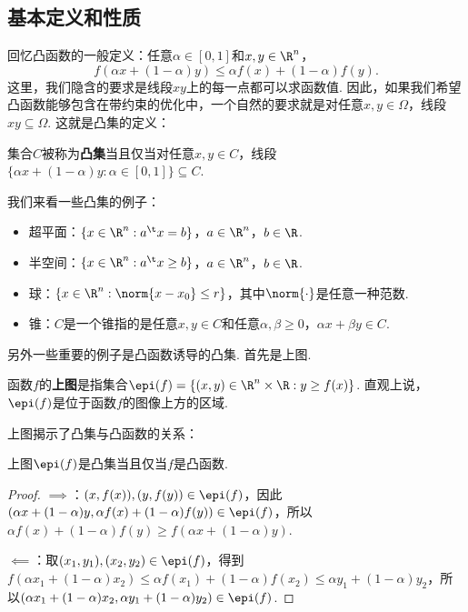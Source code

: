 \subsection{基本定义和性质}
回忆凸函数的一般定义：任意$\alpha\in[0,1]$和$x,y\in\R^n$，
    \[
        f(\alpha x+(1-\alpha) y)\leq \alpha f(x)+(1-\alpha) f(y).
    \]
这里，我们隐含的要求是线段$xy$上的每一点都可以求函数值. 因此，如果我们希望凸函数能够包含在带约束的优化中，一个自然的要求就是对任意$x,y\in \Omega$，线段$xy\subseteq \Omega$. 这就是凸集的定义：

\begin{definition}[凸集]
集合$C$被称为\textbf{凸集}当且仅当对任意$x,y\in C$，线段$\{\alpha x+(1-\alpha)y:\alpha\in [0,1]\}\subseteq C$.
\end{definition}

我们来看一些凸集的例子：
\begin{example}
\begin{itemize}
    \item 超平面：$\{x\in\R^n:a^\t x= b\}$，$a\in\R^n$，$b\in\R$. 
    \item 半空间：$\{x\in\R^n:a^\t x\geq b\}$，$a\in\R^n$，$b\in\R$. 
    \item 球：$\{x\in\R^n:\norm{x-x_0}\leq r\}$，其中$\norm{\cdot}$是任意一种范数. 
    \item 锥：$C$是一个锥指的是任意$x,y\in C$和任意$\alpha,\beta\geq 0$，$\alpha x+\beta y\in C$. 
\end{itemize}
\end{example}

另外一些重要的例子是凸函数诱导的凸集. 首先是上图. 

\begin{definition}[上图]
    函数$f$的\textbf{上图}是指集合$\epi(f)=\{(x,y)\in\R^{n}\times\R:y\geq f(x)\}$. 直观上说，$\epi(f)$是位于函数$f$的图像上方的区域.
\end{definition}


上图揭示了凸集与凸函数的关系：
\begin{theorem}
    上图$\epi(f)$是凸集当且仅当$f$是凸函数.
\end{theorem}

\begin{proof}
$\implies$：$(x,f(x)),(y,f(y))\in\epi(f)$，因此$(\alpha x+(1-\alpha)y,\alpha f(x)+(1-\alpha)f(y))\in\epi(f)$，所以$\alpha f(x)+(1-\alpha)f(y)\geq f(\alpha x+(1-\alpha)y)$.

$\impliedby$：取$(x_1,y_1),(x_2,y_2)\in\epi(f)$，得到$f(\alpha x_1+(1-\alpha) x_2)\leq\alpha f(x_1)+(1-\alpha)f(x_2)\leq\alpha y_1+(1-\alpha) y_2$，所以$(\alpha x_1+(1-\alpha) x_2,\alpha y_1+(1-\alpha) y_2)\in\epi(f)$.
\end{proof}

